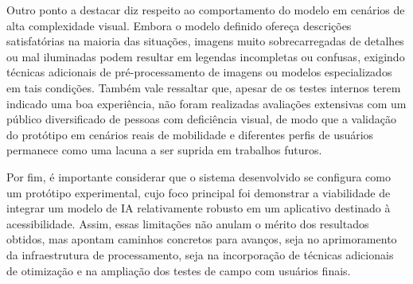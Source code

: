 Outro ponto a destacar diz respeito ao comportamento do modelo em cenários de alta complexidade visual. Embora o modelo definido ofereça descrições satisfatórias na maioria das situações, imagens muito sobrecarregadas de detalhes ou mal iluminadas podem resultar em legendas incompletas ou confusas, exigindo técnicas adicionais de pré-processamento de imagens ou modelos especializados em tais condições. Também vale ressaltar que, apesar de os testes internos terem indicado uma boa experiência, não foram realizadas avaliações extensivas com um público diversificado de pessoas com deficiência visual, de modo que a validação do protótipo em cenários reais de mobilidade e diferentes perfis de usuários permanece como uma lacuna a ser suprida em trabalhos futuros.

Por fim, é importante considerar que o sistema desenvolvido se configura como um protótipo experimental, cujo foco principal foi demonstrar a viabilidade de integrar um modelo de IA relativamente robusto em um aplicativo destinado à acessibilidade. Assim, essas limitações não anulam o mérito dos resultados obtidos, mas apontam caminhos concretos para avanços, seja no aprimoramento da infraestrutura de processamento, seja na incorporação de técnicas adicionais de otimização e na ampliação dos testes de campo com usuários finais.

